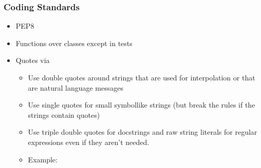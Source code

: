 \documentclass[letterpaper,10pt,english]{sphinxmanual}
\begin{document}
\subsubsection{Coding Standards}
\label{\detokenize{MANIFEST:coding-standards}}\begin{itemize}
\item {} 
PEP8

\item {} 
Functions over classes except in tests

\item {} 
Quotes via 
\begin{itemize}
\item {} 
Use double quotes around strings that are used for interpolation or that are natural language messages

\item {} 
Use single quotes for small symbol\sphinxhyphen{}like strings (but break the rules if the strings contain quotes)

\item {} 
Use triple double quotes for docstrings and raw string literals for regular expressions even if they aren’t needed.

\item {} 
Example:

\end{itemize}

\end{itemize}
\end{document}
